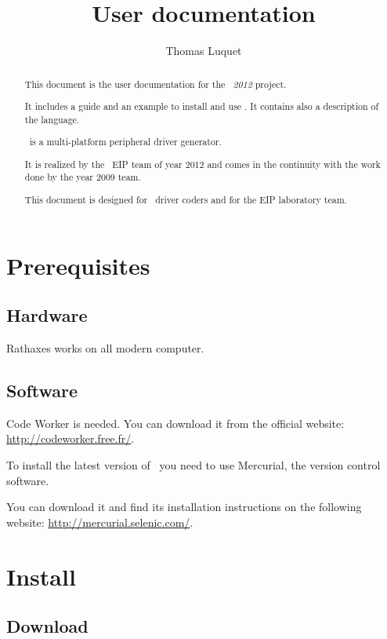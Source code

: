 \documentclass[american]{rtxreport}
\title{User documentation}
\author{Thomas Luquet}
\begin{document}
\maketitle

\begin{abstract}

This document is the user documentation for the \emph{\rtx\ 2012} project.

It includes a guide and an example to install and use \rtx. It contains also a
description of the language.

\rtx\ is a multi-platform peripheral driver generator.

It is realized by the \rtx\ EIP team of year 2012 and comes in the continuity
with the work done by the year 2009 team.

This document is designed for \rtx\ driver coders and for the EIP laboratory
team.

\end{abstract}

\rtxmaketitleblock

\tableofcontents

\chapter{Prerequisites}

\section{Hardware}

Rathaxes works on all modern computer.

\section{Software}

Code Worker is needed. You can download it from the official website:
\url{http://codeworker.free.fr/}.

To install the latest version of \rtx\ you need to use Mercurial, the version
control software.

You can download it and find its installation instructions on the following
website: \url{http://mercurial.selenic.com/}.

\chapter{Install \rtx}

\section{Download \rtx}
\end{document}

